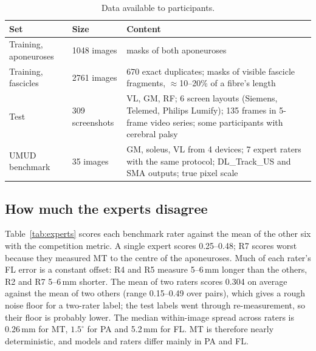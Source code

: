 \documentclass[11pt,a4paper]{article}
\begin{document}
\begin{table}[t]
\centering\small
\caption{Data available to participants.}
\label{tab:data}
\begin{tabular}{@{}llp{8.4cm}@{}}
\toprule
Set & Size & Content \\
\midrule
Training, aponeuroses & 1048 images & masks of both aponeuroses \\
Training, fascicles & 2761 images & 670 exact duplicates; masks of visible fascicle fragments, $\approx$10--20\% of a fibre's length \\
Test & 309 screenshots & VL, GM, RF; 6 screen layouts (Siemens, Telemed, Philips Lumify); 135 frames in 5-frame video series; some participants with cerebral palsy \\
UMUD benchmark & 35 images & GM, soleus, VL from 4 devices; 7 expert raters with the same protocol; DL\_Track\_US and SMA outputs; true pixel scale \\
\bottomrule
\end{tabular}
\end{table}

\subsection{How much the experts disagree}
\label{sec:experts}

Table~\ref{tab:experts} scores each benchmark rater against the mean of the other six with the competition metric. A single expert scores 0.25--0.48; R7 scores worst because they measured MT to the centre of the aponeuroses. Much of each rater's FL error is a constant offset: R4 and R5 measure 5--6\,mm longer than the others, R2 and R7 5--6\,mm shorter. The mean of two raters scores 0.304 on average against the mean of two others (range 0.15--0.49 over pairs), which gives a rough noise floor for a two-rater label; the test labels went through re-measurement, so their floor is probably lower. The median within-image spread across raters is 0.26\,mm for MT, $1.5^\circ$ for PA and 5.2\,mm for FL. MT is therefore nearly deterministic, and models and raters differ mainly in PA and FL.
\end{document}
